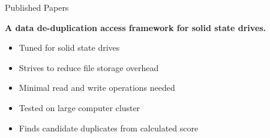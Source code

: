 \begin{frame}[t]{Published Papers}

  \hspace*{.6in}
  \begin{minipage}{3.5in}
  \begin{center}
	\vspace*{.3in}
	\textbf{A data de-duplication access framework for solid state drives.}\\
	\begin{itemize}
	\renewcommand{\labelitemi}{$\bullet$}
		\item Tuned for solid state drives
		\item Strives to reduce file storage overhead
		\item Minimal read and write operations needed
		\item Tested on large computer cluster
		\item Finds candidate duplicates from calculated score
	\end{itemize}\\

  \end{center}
  \end{minipage}

\end{frame}